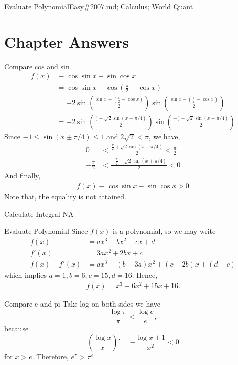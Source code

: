 \documentclass[oldfontcommands]{memoir}
\begin{document}
{\begin{question}{Evaluate Polynomial}{Easy}{\#2007.md; Calculus; World Quant}
\end{question}

\newpage\section{Chapter Answers}\begin{answer}{Compare cos and sin}
\begin{align*}
    f(x) &\equiv \cos\sin x - \sin \cos x\\
    &= \cos \sin x - \cos \left(\frac{\pi}{2} - \cos x\right)	\\
    &= -2\sin\left(\frac{\sin x + (\frac{\pi}{2} - \cos x)}{2}\right)\sin\left(\frac{\sin x - (\frac{\pi}{2} - \cos x)}{2}\right)\\
    &= -2\sin\left(\frac{\frac{\pi}{2} + \sqrt{2}\sin(x - \pi/4)}{2}\right)\sin\left(\frac{-\frac{\pi}{2} + \sqrt{2}\sin(x + \pi/4)}{2}\right)	
\end{align*}		
Since $-1 \le \sin(x \pm \pi/4) \le 1$ and $2\sqrt{2} < \pi$, we have,
\begin{align*}
    0 &< \frac{\frac{\pi}{2} + \sqrt{2}\sin(x - \pi/4)}{2} < \frac{\pi}{2}	\\
    -\frac{\pi}{2} &< \frac{-\frac{\pi}{2} + \sqrt{2}\sin(x + \pi/4)}{2} < 0
\end{align*}
And finally,
\begin{align*}
    f(x) \equiv \cos\sin x - \sin \cos x > 0
\end{align*}
Note that, the equality is not attained.\end{answer}
\begin{answer}{Calculate Integral}
NA\end{answer}
\begin{answer}{Evaluate Polynomial}
Since $f(x)$ is a polynomial, so we may write
\begin{align*}
    f(x) &= ax^3 + bx^2 + cx + d\\
    f'(x) &= 3ax^2 + 2bx + c\\		
    f(x) - f'(x) &= ax^3 + (b-3a)x^2 + (c-2b)x + (d-c)	
\end{align*}
which implies $a = 1, b= 6, c = 15, d = 16$. Hence,
\begin{align*}
    f(x) = x^3 + 6x^2 + 15x + 16.
\end{align*}
\end{answer}
\begin{answer}{Compare e and pi}
Take log on both sides we have $$\frac{\log \pi}{\pi} < \frac{\log e}{e},$$ because $$\left(\frac{\log x}{x}\right)' = - \frac{\log x + 1}{x^2} < 0$$ for $x > e$. Therefore, $e^\pi > \pi^e$.\end{answer}
}
\end{document}

